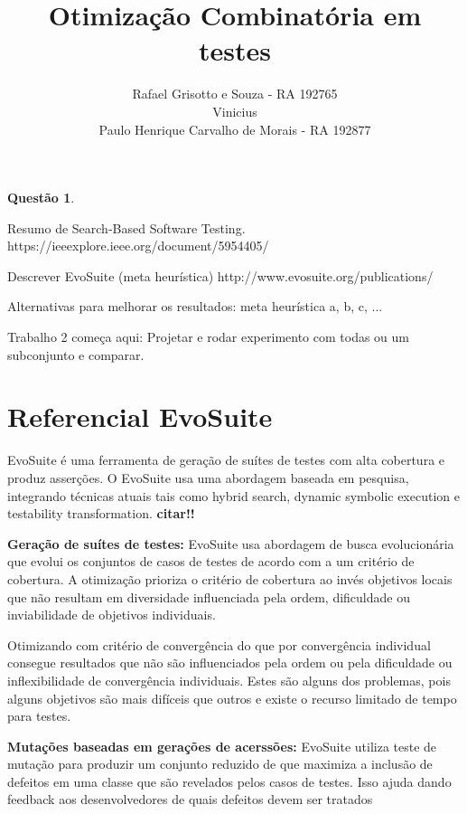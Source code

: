 \documentclass[12pt,a4paper]{article}
\title{Otimização Combinatória em  \\ testes}
\author{Rafael Grisotto e Souza - RA 192765\\ Vinicius \\ Paulo Henrique Carvalho de Morais - RA 192877}
\newtheorem{questao}{Questão}
\begin{document}
\maketitle


\begin{questao}
\end{questao}

Resumo de Search-Based Software Testing.
https://ieeexplore.ieee.org/document/5954405/

Descrever EvoSuite (meta heurística)
http://www.evosuite.org/publications/

Alternativas para melhorar os resultados: meta heurística a, b, c, ...


Trabalho 2 começa aqui:
\cite{arcuri2017restful}
Projetar e rodar experimento com todas ou um subconjunto e comparar.





\newpage

\section{Referencial EvoSuite}

EvoSuite é uma ferramenta de geração de suítes de testes com alta cobertura e produz asserções. O EvoSuite usa uma abordagem baseada em pesquisa, integrando técnicas atuais tais como hybrid
search, dynamic symbolic execution e testability transformation. \textbf{citar!!}

\textbf{Geração de suítes de testes:} EvoSuite usa abordagem de busca evolucionária que evolui os conjuntos de casos de testes de acordo com a um critério de cobertura. A otimização prioriza
o critério de cobertura ao invés objetivos locais que não resultam em diversidade influenciada pela ordem, dificuldade ou inviabilidade de objetivos individuais.

Otimizando com critério de convergência do que por convergência individual consegue resultados que não são influenciados pela ordem ou pela dificuldade ou inflexibilidade de convergência
individuais. Estes são alguns dos problemas, pois alguns objetivos são mais difíceis que outros e existe o recurso limitado de tempo para testes.


\textbf{Mutações baseadas em gerações de acerssões:} EvoSuite utiliza teste de mutação para produzir um conjunto reduzido de que maximiza a inclusão de defeitos em uma classe que são revelados pelos casos de testes. Isso ajuda dando feedback aos desenvolvedores de quais defeitos devem ser tratados 
\end{document}
